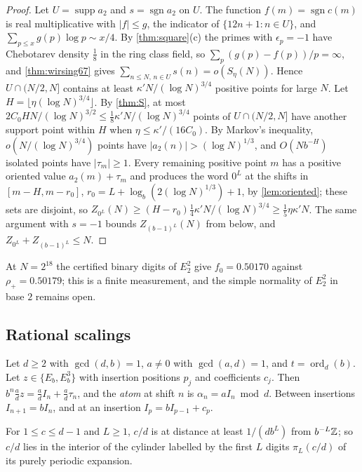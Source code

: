 \documentclass[11pt]{article}
\DeclareMathOperator{\supp}{supp}
\DeclareMathOperator{\sgn}{sgn}
\DeclareMathOperator{\ord}{ord}
\begin{document}
\begin{proof}
Let $U=\supp a_2$ and $s=\sgn a_2$ on $U$. The function $f(m)=\sgn c(m)$ is real multiplicative with
$|f|\le g$, the indicator of $\{12n+1:n\in U\}$, and $\sum_{p\le x}g(p)\log p\sim x/4$. By
\cref{thm:square}(c) the primes with $\epsilon_p=-1$ have Chebotarev density $\frac18$ in the ring
class field, so $\sum_p(g(p)-f(p))/p=\infty$, and \cref{thm:wirsing67} gives
$\sum_{n\le N,\,n\in U}s(n)=o(S_\eta(N))$. Hence $U\cap(N/2,N]$ contains at least
$\kappa'N/(\log N)^{3/4}$ positive points for large $N$. Let $H=\lfloor\eta(\log N)^{3/4}\rfloor$. By
\cref{thm:S}, at most $2C_0HN/(\log N)^{3/2}\le\frac18\kappa'N/(\log N)^{3/4}$ points of $U\cap(N/2,N]$
have another support point within $H$ when $\eta\le\kappa'/(16C_0)$. By Markov's inequality,
$o(N/(\log N)^{3/4})$ points have $|a_2(n)|>(\log N)^{1/3}$, and $O(Nb^{-H})$ isolated points have
$|\tau_m|\ge1$. Every remaining positive point $m$ has a positive oriented value
$a_2(m)+\tau_m$ and produces the word $0^L$ at the
shifts in $[m-H,m-r_0]$, $r_0=L+\log_b(2(\log N)^{1/3})+1$, by \cref{lem:oriented}; these sets are
disjoint, so $Z_{0^L}(N)\ge(H-r_0)\frac14\kappa'N/(\log N)^{3/4}\ge\frac15\eta\kappa'N$. The same
argument with $s=-1$ bounds $Z_{(b-1)^L}(N)$ from below, and $Z_{0^L}+Z_{(b-1)^L}\le N$.
\end{proof}

At $N=2^{18}$ the certified binary digits of $E_2^2$ give $f_0=0.50170$ against $\rho_+=0.50179$; this
is a finite measurement, and the simple normality of $E_2^2$ in base $2$ remains open.

\subsection{Rational scalings}\label{subsec:automaton}

Let $d\ge2$ with $\gcd(d,b)=1$, $a\ne0$ with $\gcd(a,d)=1$, and $t=\ord_d(b)$. Let
$z\in\{E_b,E_b^3\}$ with insertion positions $p_j$ and coefficients $c_j$. Then
$b^n\frac adz=\frac adI_n+\frac ad\tau_n$, and the \emph{atom} at shift $n$ is $\alpha_n=aI_n\bmod d$.
Between insertions $I_{n+1}=bI_n$, and at an insertion $I_p=bI_{p-1}+c_p$.

\begin{lemma}\label{lem:atoms}
For $1\le c\le d-1$ and $L\ge1$, $c/d$ is at distance at least $1/(db^L)$ from $b^{-L}\mathbb Z$; so $c/d$ lies
in the interior of the cylinder labelled by the first $L$ digits $\pi_L(c/d)$ of its purely periodic
expansion.
\end{lemma}
\end{document}
